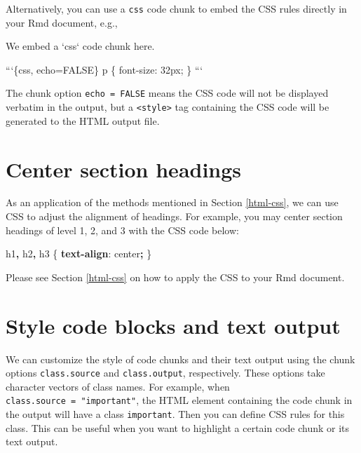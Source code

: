 \documentclass[
  11pt,
]{krantz}
\newenvironment{Shaded}{\begin{snugshade}}{\end{snugshade}}
\newcommand{\BaseNTok}[1]{\textcolor[rgb]{0.06,0.06,0.06}{#1}}
\newcommand{\DecValTok}[1]{\textcolor[rgb]{0.06,0.06,0.06}{#1}}
\newcommand{\KeywordTok}[1]{\textcolor[rgb]{0.27,0.27,0.27}{\textbf{#1}}}
\newcommand{\NormalTok}[1]{#1}
\newcommand{\OperatorTok}[1]{\textcolor[rgb]{0.43,0.43,0.43}{\textbf{#1}}}
\begin{document}
Alternatively, you can use a \texttt{css} code chunk to embed the CSS rules directly in your Rmd document, e.g.,

\begin{Shaded}
\begin{Highlighting}[]
\NormalTok{We embed a }\BaseNTok{`css`}\NormalTok{ code chunk here.}

\BaseNTok{```\{css, echo=FALSE\}}
\BaseNTok{p \{}
\BaseNTok{  font-size: 32px;}
\BaseNTok{\}}
\BaseNTok{```}
\end{Highlighting}
\end{Shaded}

The chunk option \texttt{echo\ =\ FALSE} means the CSS code will not be displayed verbatim in the output, but a \texttt{\textless{}style\textgreater{}} tag containing the CSS code will be generated to the HTML output file.

\hypertarget{center-heading}{%
\section{Center section headings}\label{center-heading}}

As an application of the methods mentioned in Section \ref{html-css}, we can use CSS to adjust the alignment of headings. For example, you may center section headings of level 1, 2, and 3 with the CSS code below:

\begin{Shaded}
\begin{Highlighting}[]
\NormalTok{h1}\OperatorTok{,}\NormalTok{ h2}\OperatorTok{,}\NormalTok{ h3 \{}
  \KeywordTok{text-align}\NormalTok{: }\DecValTok{center}\OperatorTok{;}
\NormalTok{\}}
\end{Highlighting}
\end{Shaded}

Please see Section \ref{html-css} on how to apply the CSS to your Rmd document.

\hypertarget{chunk-styling}{%
\section{Style code blocks and text output}\label{chunk-styling}}

We can customize the style of code chunks and their text output using the chunk options \texttt{class.source} and \texttt{class.output}, respectively. These options take character vectors of class names. For example, when \texttt{class.source\ =\ "important"}, the HTML element containing the code chunk in the output will have a class \texttt{important}. Then you can define CSS rules for this class. This can be useful when you want to highlight a certain code chunk or its text output.
\end{document}
